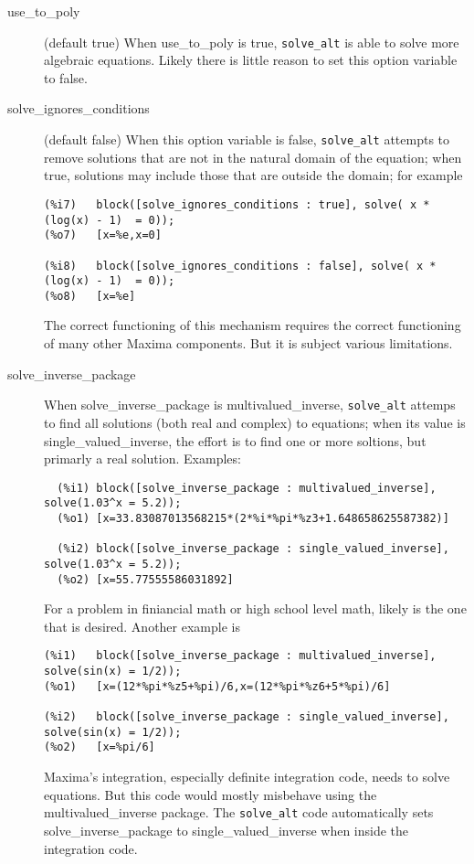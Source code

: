 \documentclass[]{scrartcl}
\newcommand{\altsolve}{\texttt{solve\_alt}}
\begin{document}
\begin{description}
\item [use\_to\_poly] (default true)  When use\_to\_poly is true, \altsolve\/ is able to solve more algebraic equations.  Likely there is little reason to set this option variable to false.

\item[solve\_ignores\_conditions] (default false) When this option variable is false, \altsolve\/ attempts to remove solutions that are not in the natural domain of the equation; when true, solutions may include those that are outside the domain; for example
\begin{verbatim}
(%i7)	block([solve_ignores_conditions : true], solve( x * (log(x) - 1)  = 0));
(%o7)	[x=%e,x=0]

(%i8)	block([solve_ignores_conditions : false], solve( x * (log(x) - 1)  = 0));
(%o8)	[x=%e]
\end{verbatim}

The correct functioning of this mechanism requires the correct functioning of many other Maxima components. But it is subject various limitations.

\item[solve\_inverse\_package] When solve\_inverse\_package is multivalued\_inverse, \altsolve\/ attemps to find all solutions (both real and complex) to equations; when its value is single\_valued\_inverse, the effort is to find one or more soltions, but primarly a real solution. Examples:
\begin{verbatim}
  (%i1)	block([solve_inverse_package : multivalued_inverse], solve(1.03^x = 5.2));
  (%o1)	[x=33.83087013568215*(2*%i*%pi*%z3+1.648658625587382)]

  (%i2)	block([solve_inverse_package : single_valued_inverse], solve(1.03^x = 5.2));
  (%o2)	[x=55.77555586031892]
\end{verbatim}
For a problem in finiancial math or high school level math, likely is the one that is desired. Another
example is
\begin{verbatim}
(%i1)	block([solve_inverse_package : multivalued_inverse], solve(sin(x) = 1/2));
(%o1)	[x=(12*%pi*%z5+%pi)/6,x=(12*%pi*%z6+5*%pi)/6]

(%i2)	block([solve_inverse_package : single_valued_inverse], solve(sin(x) = 1/2));
(%o2)	[x=%pi/6]
\end{verbatim}

Maxima's integration, especially definite integration code, needs to solve equations. But this code would mostly misbehave using the  multivalued\_inverse package. The \altsolve\/ code automatically sets solve\_inverse\_package to single\_valued\_inverse when inside the integration code.

\end{description}
\end{document}
